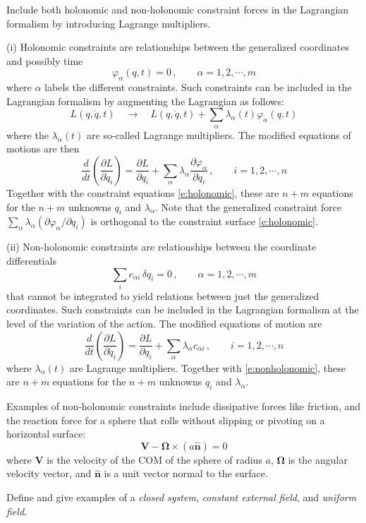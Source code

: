 \documentclass[10pt]{article}
\numberwithin{equation}{section}
\def\be{\begin{equation}}
\def\ee{\end{equation}}
\def\i{\item{}}
\newcommand{\bs}[1]{\boldsymbol{#1}}
\renewcommand{\vec}[1]{\mathbf{#1}}
\newcommand{\vecs}[1]{\bs{#1}}
\newcommand{\unit}[1]{\hat{\vec{#1}}}
\begin{document}
\i Include both holonomic and non-holonomic constraint forces 
in the Lagrangian formalism by introducing Lagrange multipliers.

(i) Holonomic constraints are relationships between the generalized
coordinates and possibly time
%
\be
\varphi_\alpha(q,t)=0\,,
\qquad \alpha=1,2,\cdots,m
\label{e:holonomic}
\ee
%
where $\alpha$ labels the different constraints.
Such constraints can be included in the Lagrangian formalism
by augmenting the Lagrangian as follows:
%
\be
L(q,\dot q, t) 
\quad \rightarrow\quad
L(q,\dot q, t) + \sum_\alpha \lambda_\alpha(t) \varphi_\alpha(q,t)
\ee
%
where the $\lambda_\alpha(t)$ are so-called Lagrange multipliers.  The
modified equations of motions are then
%
\be
\frac{d}{dt}\left(\frac{\partial L}{\partial \dot q_i}\right)
= \frac{\partial L}{\partial q_i} + \sum_\alpha
\lambda_\alpha\frac{\partial\varphi_\alpha}{\partial q_i}\,,
\qquad i = 1,2,\cdots, n
\ee
%
Together with the constraint equations \eqref{e:holonomic}, these are $n+m$ 
equations for the $n+m$ unknowns $q_i$ and $\lambda_\alpha$.
Note that the generalized constraint force
$\sum_\alpha \lambda_\alpha (\partial \varphi_\alpha/\partial q_i)$ is
orthogonal to the constraint surface \eqref{e:holonomic}.

(ii) Non-holonomic constraints are relationships between the coordinate
differentials 
%
\be
\sum_i c_{\alpha i}\,\delta q_i = 0\,,
\qquad \alpha = 1,2,\cdots, m
\label{e:nonholonomic}
\ee
%
that cannot be integrated to yield relations between just the
generalized coordinates.
Such constraints can be included in the Lagrangian formalism 
at the level of the variation of the action.
The modified equations of motion are
%
\be
\frac{d}{dt}\left(\frac{\partial L}{\partial \dot q_i}\right)
= \frac{\partial L}{\partial q_i} +
\sum_\alpha \lambda_\alpha c_{\alpha i}\,,
\qquad i=1,2,\cdots, n
\ee
%
where $\lambda_\alpha(t)$ are Lagrange multipliers.
Together with \eqref{e:nonholonomic}, these are $n+m$ equations 
for the $n+m$ unknowns $q_i$ and $\lambda_\alpha$.

Examples of non-holonomic constraints include dissipative 
forces like friction, and the reaction force for a 
sphere that rolls without slipping or pivoting on a 
horizontal surface:
%
\be
\vec V - \vecs\Omega\times(a\unit n) = 0
\ee
%
where $\vec V$ is the velocity of the COM of the sphere
of radius $a$, $\vecs\Omega$ is the angular velocity vector,
and $\unit{n}$ is a unit vector normal to the surface.

\i Define and give examples of a {\em closed system}, 
{\em constant external field}, and {\em uniform field}.
\end{document}

